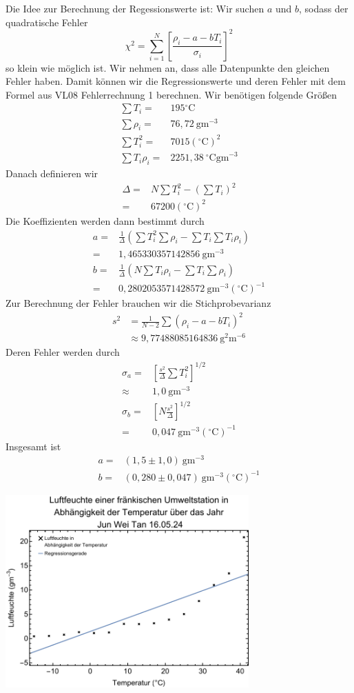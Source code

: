 \documentclass[prb,12pt]{revtex4-2}
\theoremstyle{definition}
\theoremstyle{definition}
\begin{document}
Die Idee zur Berechnung der Regessionswerte ist: Wir suchen $a$ und $b$, sodass der quadratische Fehler
\[\chi^2=\sum_{i=1}^N \left[\frac{\rho_i - a - b T_i}{\sigma_i}\right]^2\]
so klein wie möglich ist. Wir nehmen an, dass alle Datenpunkte den gleichen Fehler haben. Damit können wir die Regressionswerte und deren Fehler mit dem Formel aus VL08 Fehlerrechnung 1 berechnen.
Wir benötigen folgende Größen
\begin{align*}
	\sum T_i=&195{}^{\circ}\text{C}\\
	\sum \rho_i=& 76,72~\text{gm}^{-3}\\
	\sum T_i^2=&7015\left({}^{\circ}\text{C}\right)^2\\
	\sum T_i \rho_i=& 2251,38~{}^{\circ}\text{Cgm}^{-3}
\end{align*}
Danach definieren wir
\begin{align*}
	\Delta =& N\sum T_i^2 - \left(\sum T_i\right)^2\\
	=&67200\left({}^{\circ}\text{C}\right)^2
\end{align*}
Die Koeffizienten werden dann bestimmt durch
\begin{align*}
	a=&\frac 1\Delta \left(\sum T_i^2 \sum \rho_i - \sum T_i \sum T_i \rho_i\right)\\
	=&1,465330357142856~\text{gm}^{-3}\\
	b=& \frac 1\Delta\left(N\sum T_i \rho_i - \sum T_i \sum \rho_i\right)\\
	=& 0,2802053571428572~\text{gm}^{-3}({}^{\circ}\text{C})^{-1}
\end{align*}
Zur Berechnung der Fehler brauchen wir die Stichprobevarianz
\begin{align*}
s^2&=\frac{1}{N-2}\sum \left(\rho_i - a - bT_i\right)^2\\
&\approx 9,77488085164836~\text{g}^2\text{m}^{-6}
\end{align*}
Deren Fehler werden durch
\begin{align*}
\sigma_a =& \left[\frac{s^2}{\Delta}\sum T_i^2\right]^{1/2}\\
\approx& 1,0 ~\text{gm}^{-3}\\
\sigma_b=& \left[N\frac{s^2}{\Delta}\right]^{1/2}\\
=&0,047~\text{gm}^{-3}({}^{\circ}\text{C})^{-1}
\end{align*}
Insgesamt ist
\begin{align*}
	a=&(1,5\pm 1,0)~\text{gm}^{-3}\\
	b=&(0,280\pm 0,047)~\text{gm}^{-3}({}^{\circ}\text{C})^{-1}
\end{align*}
\begin{center}
\includegraphics[width=0.7\textwidth]{plt.pdf}
\end{center}
\end{document}
